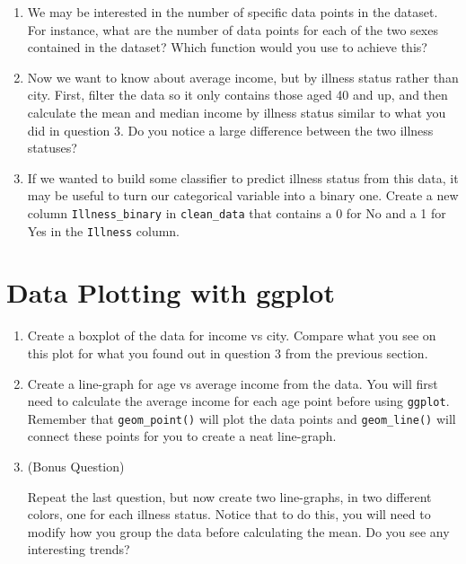 \documentclass[]{article}
\begin{document}
\begin{enumerate}
		\item
		We may be interested in the number of specific data points in the dataset. For instance, what are the number of data points for each of the two sexes contained in the dataset? Which function would you use to achieve this?
		
		\item
		Now we want to know about average income, but by illness status rather than city. First, filter the data so it only contains those aged 40 and up, and then calculate the mean and median income by illness status similar to what you did in question 3. Do you notice a large difference between the two illness statuses? 
		
		\item
		If we wanted to build some classifier to predict illness status from this data, it may be useful to turn our categorical variable into a binary one. Create a new column \verb|Illness_binary| in \verb|clean_data| that contains a 0 for No and a 1 for Yes in the \verb|Illness| column. 
		
	\end{enumerate}

	\section*{Data Plotting with ggplot}
	\begin{enumerate}
		\item 		
		Create a boxplot of the data for income vs city. Compare what you see on this plot for what you found out in question 3 from the previous section.
		
		\item
		Create a line-graph for age vs average income from the data. You will first need to calculate the average income for each age point before using \verb|ggplot|. Remember that \verb|geom_point()| will plot the data points and \verb|geom_line()| will connect these points for you to create a neat line-graph. 
		
		\item
		(Bonus Question)
		
		Repeat the last question, but now create two line-graphs, in two different colors, one for each illness status. Notice that to do this, you will need to modify how you group the data before calculating the mean. Do you see any interesting trends? 
	\end{enumerate}
\end{document}
